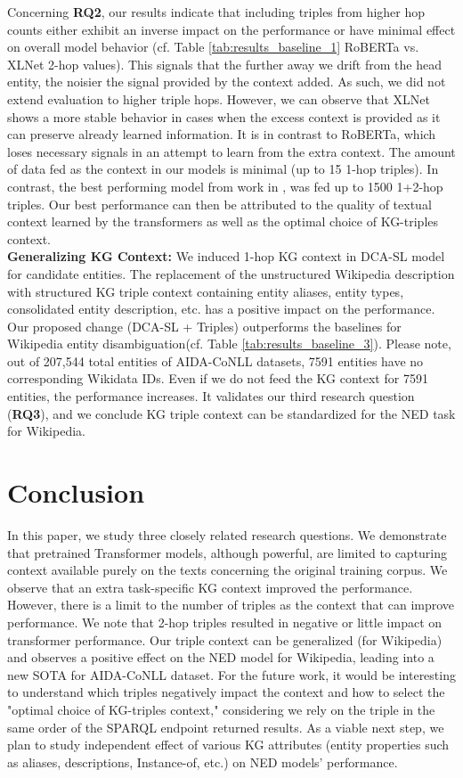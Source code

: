 \documentclass[sigconf, superscriptaddress]{acmart}
\begin{document}
Concerning \textbf{RQ2}, our results indicate that including triples from higher hop counts either exhibit an inverse impact on the performance or have minimal effect on overall model behavior (cf. Table \ref{tab:results_baseline_1} RoBERTa vs. XLNet 2-hop values). This signals that the further away we drift from the head entity, the noisier the signal provided by the context added. As such, we did not extend evaluation to higher triple hops. However, we can observe that XLNet shows a more stable behavior in cases when the excess context is provided as it can preserve already learned information. It is in contrast to RoBERTa, which loses necessary signals in an attempt to learn from the extra context. The amount of data fed as the context in our models is minimal (up to 15 1-hop triples). In contrast,  the best performing model from work in \cite{cetoli2019neural}, was fed up to 1500 1+2-hop triples. Our best performance can then be attributed to the quality of textual context learned by the transformers as well as the optimal choice of KG-triples context.\\
\textbf{Generalizing KG Context:} We induced 1-hop KG context in DCA-SL model \cite{DBLP:conf/emnlp/YangGLTZWCHR19} for candidate entities. The replacement of the unstructured Wikipedia description with structured KG triple context containing entity aliases, entity types, consolidated entity description, etc. has a positive impact on the performance. Our proposed change (DCA-SL + Triples) outperforms the baselines for Wikipedia entity disambiguation(cf. Table \ref{tab:results_baseline_3}). Please note, out of 207,544 total entities of AIDA-CoNLL datasets, 7591 entities have no corresponding Wikidata IDs. Even if we do not feed the KG context for 7591 entities, the performance increases. It validates our third research question (\textbf{RQ3}), and we conclude KG triple context can be standardized for the NED task for Wikipedia. 

\section{Conclusion}
\label{sec:conclusion}
In this paper, we study three closely related research questions. We demonstrate that pretrained Transformer models, although powerful, are limited to capturing context available purely on the texts concerning the original training corpus. We observe that an extra task-specific KG context improved the performance. However, there is a limit to the number of triples as the context that can improve performance. We note that 2-hop triples resulted in negative or little impact on transformer performance.  Our triple context can be generalized (for Wikipedia) and observes a positive effect on the NED model for Wikipedia, leading into a new SOTA for AIDA-CoNLL dataset. For the future work, it would be interesting to understand which triples negatively impact the context and how to select the "optimal choice of KG-triples context," considering we rely on the triple in the same order of the SPARQL endpoint returned results. As a viable next step, we plan to study independent effect of various KG attributes (entity properties such as aliases, descriptions, Instance-of, etc.) on NED models' performance.
\end{document}
